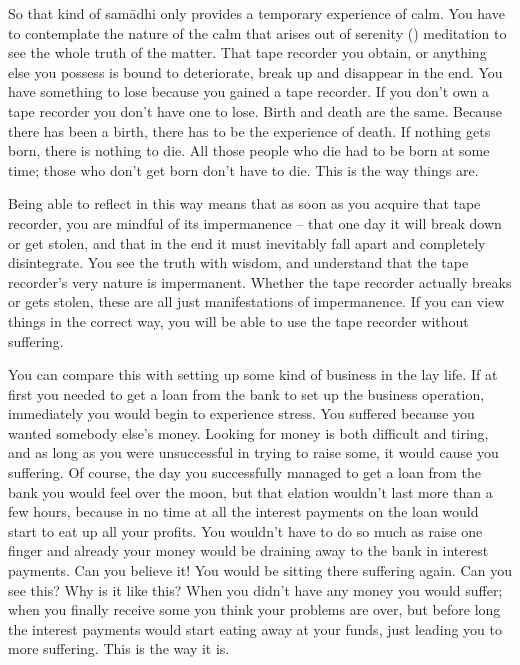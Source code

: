 So that kind of sam\=adhi only provides a temporary experience of calm. You have to contemplate the nature of the calm that arises out of serenity () meditation to see the whole truth of the matter. That tape recorder you obtain, or anything else you possess is bound to deteriorate, break up and disappear in the end. You have something to lose because you gained a tape recorder. If you don't own a tape recorder you don't have one to lose. Birth and death are the same. Because there has been a birth, there has to be the experience of death. If nothing gets born, there is nothing to die. All those people who die had to be born at some time; those who don't get born don't have to die. This is the way things are.

Being able to reflect in this way means that as soon as you acquire that tape recorder, you are mindful of its impermanence -- that one day it will break down or get stolen, and that in the end it must inevitably fall apart and completely disintegrate. You see the truth with wisdom, and understand that the tape recorder's very nature is impermanent. Whether the tape recorder actually breaks or gets stolen, these are all just manifestations of impermanence. If you can view things in the correct way, you will be able to use the tape recorder without suffering.

You can compare this with setting up some kind of business in the lay life. If at first you needed to get a loan from the bank to set up the business operation, immediately you would begin to experience stress. You suffered because you wanted somebody else's money. Looking for money is both difficult and tiring, and as long as you were unsuccessful in trying to raise some, it would cause you suffering. Of course, the day you successfully managed to get a loan from the bank you would feel over the moon, but that elation wouldn't last more than a few hours, because in no time at all the interest payments on the loan would start to eat up all your profits. You wouldn't have to do so much as raise one finger and already your money would be draining away to the bank in interest payments. Can you believe it! You would be sitting there suffering again. Can you see this? Why is it like this? When you didn't have any money you would suffer; when you finally receive some you think your problems are over, but before long the interest payments would start eating away at your funds, just leading you to more suffering. This is the way it is.

